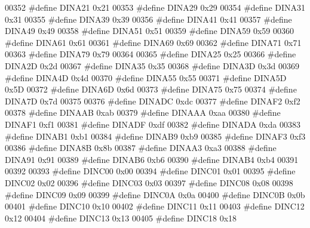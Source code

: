\begin{DoxyCode}
00352 \textcolor{preprocessor}{#define DINA21 0x21}
00353 \textcolor{preprocessor}{#define DINA29 0x29}
00354 \textcolor{preprocessor}{#define DINA31 0x31}
00355 \textcolor{preprocessor}{#define DINA39 0x39}
00356 \textcolor{preprocessor}{#define DINA41 0x41}
00357 \textcolor{preprocessor}{#define DINA49 0x49}
00358 \textcolor{preprocessor}{#define DINA51 0x51}
00359 \textcolor{preprocessor}{#define DINA59 0x59}
00360 \textcolor{preprocessor}{#define DINA61 0x61}
00361 \textcolor{preprocessor}{#define DINA69 0x69}
00362 \textcolor{preprocessor}{#define DINA71 0x71}
00363 \textcolor{preprocessor}{#define DINA79 0x79}
00364 
00365 \textcolor{preprocessor}{#define DINA25 0x25}
00366 \textcolor{preprocessor}{#define DINA2D 0x2d}
00367 \textcolor{preprocessor}{#define DINA35 0x35}
00368 \textcolor{preprocessor}{#define DINA3D 0x3d}
00369 \textcolor{preprocessor}{#define DINA4D 0x4d}
00370 \textcolor{preprocessor}{#define DINA55 0x55}
00371 \textcolor{preprocessor}{#define DINA5D 0x5D}
00372 \textcolor{preprocessor}{#define DINA6D 0x6d}
00373 \textcolor{preprocessor}{#define DINA75 0x75}
00374 \textcolor{preprocessor}{#define DINA7D 0x7d}
00375 
00376 \textcolor{preprocessor}{#define DINADC 0xdc}
00377 \textcolor{preprocessor}{#define DINAF2 0xf2}
00378 \textcolor{preprocessor}{#define DINAAB 0xab}
00379 \textcolor{preprocessor}{#define DINAAA 0xaa}
00380 \textcolor{preprocessor}{#define DINAF1 0xf1}
00381 \textcolor{preprocessor}{#define DINADF 0xdf}
00382 \textcolor{preprocessor}{#define DINADA 0xda}
00383 \textcolor{preprocessor}{#define DINAB1 0xb1}
00384 \textcolor{preprocessor}{#define DINAB9 0xb9}
00385 \textcolor{preprocessor}{#define DINAF3 0xf3}
00386 \textcolor{preprocessor}{#define DINA8B 0x8b}
00387 \textcolor{preprocessor}{#define DINAA3 0xa3}
00388 \textcolor{preprocessor}{#define DINA91 0x91}
00389 \textcolor{preprocessor}{#define DINAB6 0xb6}
00390 \textcolor{preprocessor}{#define DINAB4 0xb4}
00391 
00392 
00393 \textcolor{preprocessor}{#define DINC00 0x00}
00394 \textcolor{preprocessor}{#define DINC01 0x01}
00395 \textcolor{preprocessor}{#define DINC02 0x02}
00396 \textcolor{preprocessor}{#define DINC03 0x03}
00397 \textcolor{preprocessor}{#define DINC08 0x08}
00398 \textcolor{preprocessor}{#define DINC09 0x09}
00399 \textcolor{preprocessor}{#define DINC0A 0x0a}
00400 \textcolor{preprocessor}{#define DINC0B 0x0b}
00401 \textcolor{preprocessor}{#define DINC10 0x10}
00402 \textcolor{preprocessor}{#define DINC11 0x11}
00403 \textcolor{preprocessor}{#define DINC12 0x12}
00404 \textcolor{preprocessor}{#define DINC13 0x13}
00405 \textcolor{preprocessor}{#define DINC18 0x18}

\end{DoxyCode}
